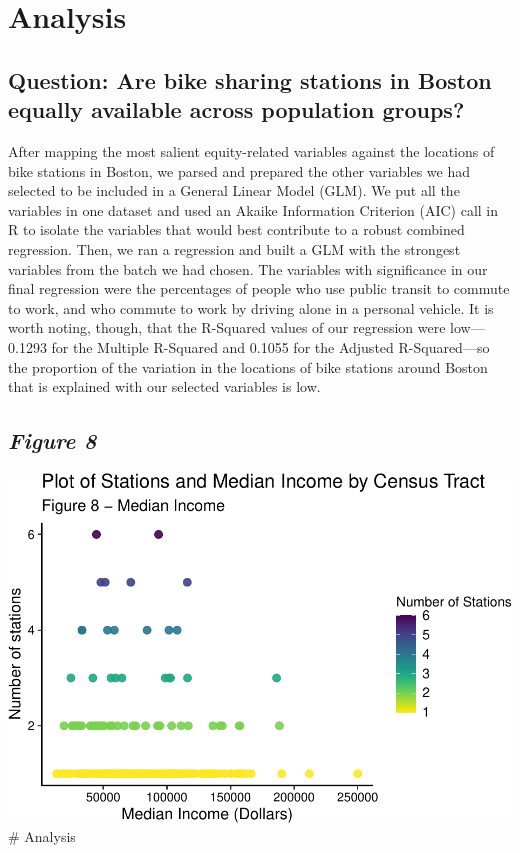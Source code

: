\documentclass[
  12pt,
]{article}
\begin{document}
\newpage

\hypertarget{analysis}{%
\section{Analysis}\label{analysis}}

\hypertarget{question-are-bike-sharing-stations-in-boston-equally-available-across-population-groups}{%
\subsection{Question: Are bike sharing stations in Boston equally
available across population
groups?}\label{question-are-bike-sharing-stations-in-boston-equally-available-across-population-groups}}

After mapping the most salient equity-related variables against the
locations of bike stations in Boston, we parsed and prepared the other
variables we had selected to be included in a General Linear Model
(GLM). We put all the variables in one dataset and used an Akaike
Information Criterion (AIC) call in R to isolate the variables that
would best contribute to a robust combined regression. Then, we ran a
regression and built a GLM with the strongest variables from the batch
we had chosen. The variables with significance in our final regression
were the percentages of people who use public transit to commute to
work, and who commute to work by driving alone in a personal vehicle. It
is worth noting, though, that the R-Squared values of our regression
were low---0.1293 for the Multiple R-Squared and 0.1055 for the Adjusted
R-Squared---so the proportion of the variation in the locations of bike
stations around Boston that is explained with our selected variables is
low.

\hypertarget{figure-8}{%
\subsection{\texorpdfstring{\emph{Figure 8}}{Figure 8}}\label{figure-8}}

\includegraphics{Project_Template_files/figure-latex/data scatterplots income-1.pdf}
\newpage \# Analysis
\end{document}
